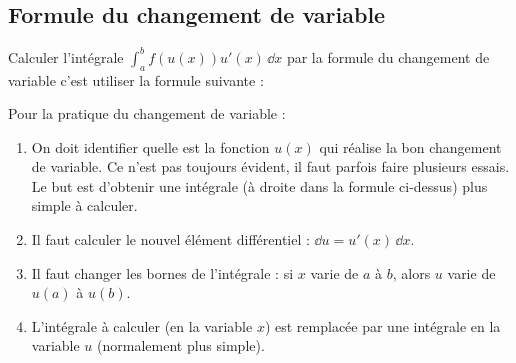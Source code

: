 \documentclass[11pt,class=report,crop=false]{standalone}
\begin{document}





\bigskip

\subsection*{Formule du changement de variable}



Calculer l'intégrale $\int_a^b  f(u(x)) u'(x) \, \dd x$ par la formule du changement de variable
c'est utiliser la formule suivante :


Pour la pratique du changement de variable :
\begin{enumerate}
  \item On doit identifier quelle est la fonction $u(x)$ qui réalise la bon changement de variable.
  Ce n'est pas toujours évident, il faut parfois faire plusieurs essais. Le but est d'obtenir une intégrale (à droite dans la formule ci-dessus) plus simple à calculer.

  \item Il faut calculer le nouvel élément différentiel : $\dd u = u'(x) \, \dd x$.

  \item Il faut changer les bornes de l'intégrale : si $x$ varie de $a$ à $b$, alors $u$ varie de $u(a)$ à $u(b)$.
  \item L'intégrale à calculer (en la variable $x$) est remplacée par une intégrale en la variable $u$ (normalement plus simple).
\end{enumerate}
\end{document}
